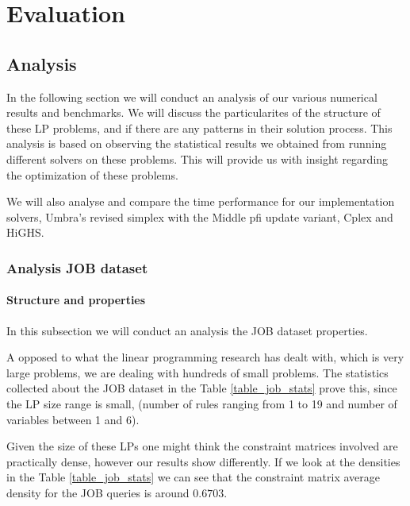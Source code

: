 
\chapter{Evaluation}\label{chapter:evaluation}
\section{Analysis}
In the following section we will conduct an analysis of our various numerical results
and benchmarks.
We will discuss the
particularites of the structure of these LP problems, and if there are any
patterns in their solution
process. This analysis is based on observing the statistical results we obtained from
running different solvers on these problems. This will provide us with insight
regarding the optimization of these problems.

We will also analyse and compare the time performance for our implementation solvers,
Umbra's revised simplex with the Middle \gls{pfi} update variant, Cplex and HiGHS.


\subsection{Analysis JOB dataset}

\subsubsection{Structure and properties}
In  this subsection we will conduct an analysis the JOB dataset properties.

A opposed to what the linear programming research has dealt with, which is
very large problems, we are dealing with hundreds of small problems. The statistics
collected about the JOB dataset in the Table \ref{table_job_stats} prove this, since the LP size range is small, (number
of rules ranging from 1 to 19 and number of variables between 1 and 6).

Given the size of these LPs one might think the constraint matrices involved
are practically dense, however our results show differently. If we look at the densities
in the Table \ref{table_job_stats} we can see that the constraint matrix average density
for the JOB queries is around $0.6703$.

